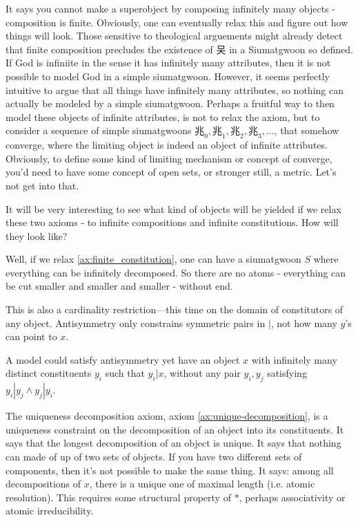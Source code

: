 It says you cannot make a superobject by composing infinitely many objects - composition is finite. Obviously, one can eventually relax this and figure out how things will look. Those sensitive to theological arguements might already detect that finite composition precludes the existence of 㕦 in a Siumatgwoon so defined. If God is infiniite in the sense it has infinitely many attributes, then it is not possible to model God in a simple siumatgwoon. However, it seems perfectly intuitive to argue that all things have infinitely many attributes, so nothing can actually be modeled by a simple siumatgwoon. Perhaps a fruitful way to then model these objects of infinite attributes, is not to relax the axiom, but to consider a sequence of simple siumatgwoons $\text{兆}_0,\text{兆}_1, \text{兆}_2, \text{兆}_3, \ldots$, that somehow converge, where the limiting object is indeed an object of infinite attributes. Obviously, to define some kind of limiting mechanism or concept of converge, you'd need to have some concept of open sets, or stronger still, a metric. Let's not get into that. 


It will be very interesting to see what kind of objects will be yielded if we relax these two axioms - to infinite compositions and infinite constitutions. How will they look like?

Well, if we relax \ref{ax:finite_constitution}, one can have a siumatgwoon $S$ where everything can be infinitely decomposed. So there are no atoms - everything can be cut smaller and smaller and smaller - without end.

This is also a cardinality restriction—this time on the domain of constitutors of any object. Antisymmetry only constrains symmetric pairs in $|$, not how many $y$'s can point to $x$.

A model could satisfy antisymmetry yet have an object $x$ with infinitely many distinct constituents $y_i$ such that $y_i|x$, without any pair $y_i, y_j$ satisfying $y_i|y_j \wedge y_j|y_i$.

The uniqueness decomposition axiom, axiom \ref{ax:unique-decomposition}, is a uniqueness constraint on the decomposition of an object into its constituents. It says that the longest decomposition of an object is unique. It says that nothing can made of up of two sets of objects. If you have two different sets of components, then it's not possible to make the same thing. It says: among all decompositions of $x$, there is a unique one of maximal length (i.e. atomic resolution). This requires some structural property of $*$, perhaps associativity or atomic irreducibility. 

